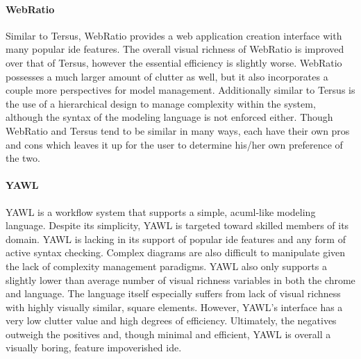 \paragraph{WebRatio} Similar to Tersus, WebRatio provides a web application
creation interface with many popular \ac{ide} features. The overall visual
richness of WebRatio is improved over that of Tersus, however the essential
efficiency is slightly worse.  WebRatio possesses a much larger amount of
clutter as well, but it also incorporates a couple more perspectives for
model management. Additionally similar to Tersus is the use of a
hierarchical design to manage complexity within the system, although the
syntax of the modeling language is not enforced either. Though WebRatio and
Tersus tend to be similar in many ways, each have their own pros and cons
which leaves it up for the user to determine his/her own preference of the
two.

\paragraph{YAWL} YAWL is a workflow system that supports a simple,
ac{uml}-like modeling language. Despite its simplicity, YAWL is targeted
toward skilled members of its domain. YAWL is lacking in its support of
popular \ac{ide} features and any form of active syntax checking. Complex
diagrams are also difficult to manipulate given the lack of complexity
management paradigms.  YAWL also only supports a slightly lower than
average number of visual richness variables in both the chrome and
language. The language itself especially suffers from lack of visual
richness with highly visually similar, square elements. However, YAWL's
interface has a very low clutter value and high degrees of efficiency.
Ultimately, the negatives outweigh the positives and, though minimal and
efficient, YAWL is overall a visually boring, feature impoverished
\ac{ide}.


